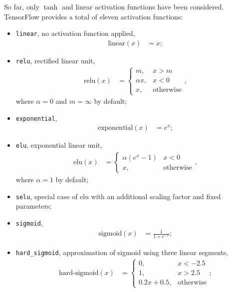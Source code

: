 So far, only $\tanh$ and linear activation functions have been considered.
TensorFlow provides a total of eleven activation functions:
\begin{itemize}
    \item\texttt{linear}, no activation function applied,
        \begin{align*}
            \text{linear}(x) &= x;
        \end{align*}

    \item\texttt{relu}, rectified linear unit,
        \begin{align*}
            \text{relu}(x) &= \begin{cases}
                m, & x > m\\
                \alpha x, & x < 0\\
                x, & \text{otherwise}
            \end{cases},
        \end{align*}
        where $\alpha = 0$ and $m = \infty$ by default;

    \item\texttt{exponential},
        \begin{align*}
            \text{exponential}(x) &= e^x;
        \end{align*}

    \item\texttt{elu}, exponential linear unit,
        \begin{align*}
            \text{elu}(x) &= \begin{cases}
                \alpha (e^x - 1) & x < 0\\
                x, & \text{otherwise}
            \end{cases},
        \end{align*}
        where $\alpha = 1$ by default;

    \item\texttt{selu}, special case of elu with an additional scaling factor
        and fixed parameters;

    \item\texttt{sigmoid},
        \begin{align*}
            \text{sigmoid}(x) &= \frac{1}{1 + e^{-x}};
        \end{align*}

    \item\texttt{hard\_sigmoid}, approximation of sigmoid using three linear
        segments,
        \begin{align*}
            \text{hard-sigmoid}(x) &= \begin{cases}
                0, & x < -2.5\\
                1, & x > 2.5\\
                0.2x + 0.5, & \text{otherwise}
            \end{cases};
        \end{align*}


\end{itemize}
